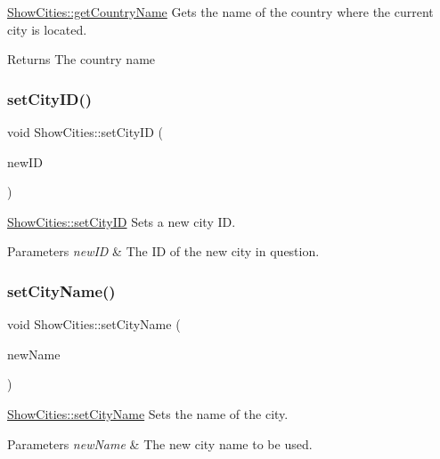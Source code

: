 \mbox{\hyperlink{class_show_cities_a93cf32e7ef19a182d0022c9c888392aa}{Show\+Cities\+::get\+Country\+Name}} Gets the name of the country where the current city is located. 

\begin{DoxyReturn}{Returns}
The country name 
\end{DoxyReturn}
\mbox{\label{class_show_cities_acd17480ad6a64e989e9aa0b07d30141b}} 
\subsubsection{\texorpdfstring{set\+City\+I\+D()}{setCityID()}}
{\footnotesize\ttfamily void Show\+Cities\+::set\+City\+ID (\begin{DoxyParamCaption}\item[{int}]{new\+ID }\end{DoxyParamCaption})}



\mbox{\hyperlink{class_show_cities_acd17480ad6a64e989e9aa0b07d30141b}{Show\+Cities\+::set\+City\+ID}} Sets a new city ID. 


\begin{DoxyParams}{Parameters}
{\em new\+ID} & The ID of the new city in question. \\
\hline
\end{DoxyParams}
\mbox{\label{class_show_cities_acadd6c1bdb26d30e796bab4b5b2acfd9}} 
\subsubsection{\texorpdfstring{set\+City\+Name()}{setCityName()}}
{\footnotesize\ttfamily void Show\+Cities\+::set\+City\+Name (\begin{DoxyParamCaption}\item[{Q\+String}]{new\+Name }\end{DoxyParamCaption})}



\mbox{\hyperlink{class_show_cities_acadd6c1bdb26d30e796bab4b5b2acfd9}{Show\+Cities\+::set\+City\+Name}} Sets the name of the city. 


\begin{DoxyParams}{Parameters}
{\em new\+Name} & The new city name to be used. \\
\hline
\end{DoxyParams}
\mbox{\label{class_show_cities_a853a958ebc2c0d42d872c237d431fe25}} 
